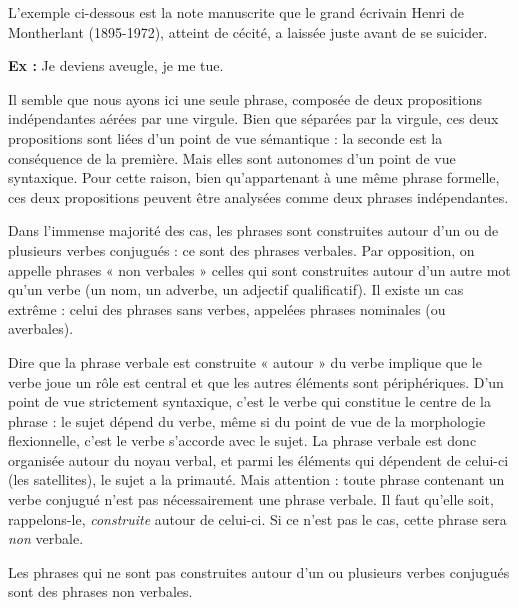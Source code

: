 L’exemple ci-dessous est la note manuscrite que le grand écrivain Henri de Montherlant (1895-1972), atteint de cécité, a laissée juste avant de se suicider.

\noindent\textbf{Ex :} Je deviens aveugle, je me tue.

Il semble que nous ayons ici une seule phrase, composée de deux propositions indépendantes aérées par une virgule. Bien que séparées par la virgule, ces deux propositions sont liées d’un point de vue sémantique : la seconde est la conséquence de la première. Mais elles sont autonomes d’un point de vue syntaxique. Pour cette raison, bien qu’appartenant à une même phrase formelle, ces deux propositions peuvent être analysées comme deux phrases indépendantes.

Dans l’immense majorité des cas, les phrases sont construites autour d’un ou de plusieurs verbes conjugués : ce sont des phrases verbales. Par opposition, on appelle phrases « non verbales » celles qui sont construites autour d’un autre mot qu’un verbe (un nom, un adverbe, un adjectif
qualificatif). Il existe un cas extrême : celui des phrases sans verbes, appelées phrases nominales (ou averbales).

Dire que la phrase verbale est construite « autour » du verbe implique que le verbe joue un rôle est central et que les autres éléments sont périphériques. D’un point de vue strictement syntaxique, c’est le verbe qui constitue le centre de la phrase : le sujet dépend du verbe, même si du point de vue de la morphologie flexionnelle, c’est le verbe s’accorde avec le sujet. La phrase verbale est donc organisée autour du noyau verbal, et parmi les éléments qui dépendent de celui-ci (les satellites), le sujet a la primauté. Mais attention : toute phrase contenant un verbe conjugué n’est pas nécessairement une phrase verbale. Il faut qu’elle soit, rappelons-le, \textit{construite} autour de celui-ci. Si ce n’est pas le cas, cette phrase sera \textit{non} verbale.

Les phrases qui ne sont pas construites autour d’un ou plusieurs verbes conjugués sont des phrases non verbales.

